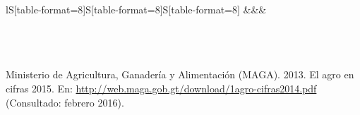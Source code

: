 \begin{center}
\begin{tabular}{lS[table-format=8]S[table-format=8]S[table-format=8]}
		\hline
		&&&\\[-0.36cm]
		\\
		\\
		\\	
	\end{tabular}\addtocounter{Cuadro}{1}
\end{center}
$\ $\\[-1cm]{\footnotesize	Ministerio de Agricultura, Ganadería y Alimentación (MAGA). 2013. El agro en cifras 2015. En: \url{http://web.maga.gob.gt/download/1agro-cifras2014.pdf}  (Consultado: febrero 2016).}\\




